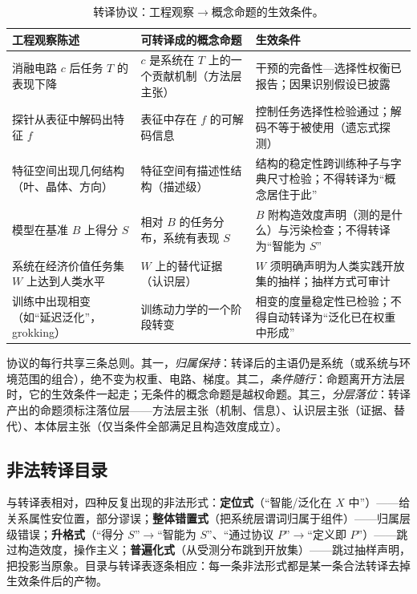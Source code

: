 \documentclass[10pt,fontset=fandol]{ctexart}
\begin{document}
\begin{table}[t]
\centering
\caption{转译协议：工程观察$\to$概念命题的生效条件。}
\label{tab:protocol}
\small
\begin{tabularx}{\textwidth}{p{3.6cm} X p{4.2cm}}
\toprule
工程观察陈述 & 可转译成的概念命题 & 生效条件 \\
\midrule
消融电路 $c$ 后任务 $T$ 的表现下降 & $c$ 是系统在 $T$ 上的一个贡献机制（方法层主张） & 干预的完备性—选择性权衡已报告\cite{canby2024reliable}；因果识别假设已披露\cite{lin2026disclose} \\
探针从表征中解码出特征 $f$ & 表征中存在 $f$ 的可解码信息 & 控制任务选择性检验通过\cite{hewitt2019designing}；解码不等于被使用（遗忘式探测）\cite{belinkov2022probing} \\
特征空间出现几何结构（叶、晶体、方向） & 特征空间有描述性结构（描述级） & 结构的稳定性跨训练种子与字典尺寸检验\cite{leask2025canonical}；不得转译为“概念居住于此” \\
模型在基准 $B$ 上得分 $S$ & 相对 $B$ 的任务分布，系统有表现 $S$ & $B$ 附构造效度声明（测的是什么）与污染检查\cite{bean2025measuring,zhang2024gsm1k}；不得转译为“智能为 $S$” \\
系统在经济价值任务集 $W$ 上达到人类水平 & $W$ 上的替代证据（认识层） & $W$ 须明确声明为人类实践开放集的抽样\cite{yu2026theory}；抽样方式可审计\cite{yu2026methodology} \\
训练中出现相变（如“延迟泛化”，grokking\cite{power2022grokking}） & 训练动力学的一个阶段转变 & 相变的度量稳定性已检验\cite{schaeffer2023mirage}；不得自动转译为“泛化已在权重中形成”\cite{nanda2023progress} \\
\bottomrule
\end{tabularx}
\end{table}

协议的每行共享三条总则。其一，\emph{归属保持}：转译后的主语仍是系统（或系统与环境范围的组合），绝不变为权重、电路、梯度。其二，\emph{条件随行}：命题离开方法层时，它的生效条件一起走；无条件的概念命题是越权命题。其三，\emph{分层落位}：转译产出的命题须标注落位层——方法层主张（机制、信息）、认识层主张（证据、替代）、本体层主张（仅当条件全部满足且构造效度成立）。

\subsection{非法转译目录}

与转译表相对，四种反复出现的非法形式：\textbf{定位式}（“智能/泛化在 $X$ 中”）——给关系属性安位置，部分谬误；\textbf{整体错置式}（把系统层谓词归属于组件）——归属层级错误；\textbf{升格式}（“得分 $S$”$\to$“智能为 $S$”、“通过协议 $P$”$\to$“定义即 $P$”）——跳过构造效度，操作主义；\textbf{普遍化式}（从受测分布跳到开放集）——跳过抽样声明，把投影当原象。目录与转译表逐条相应：每一条非法形式都是某一条合法转译去掉生效条件后的产物。
\end{document}
